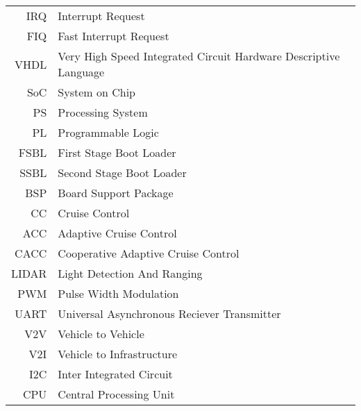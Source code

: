 \begin{tabular}{r l}
IRQ		&Interrupt Request\\
FIQ		&Fast Interrupt Request\\
VHDL	&Very High Speed Integrated Circuit Hardware Descriptive Language\\
SoC		&System on Chip\\
PS		&Processing System\\
PL		&Programmable Logic\\
FSBL	&First Stage Boot Loader\\
SSBL	&Second Stage Boot Loader\\
BSP		&Board Support Package\\
CC		&Cruise Control\\
ACC		&Adaptive Cruise Control\\
CACC	&Cooperative Adaptive Cruise Control\\
LIDAR	&Light Detection And Ranging\\
PWM		&Pulse Width Modulation\\
UART	&Universal Asynchronous Reciever Transmitter\\
V2V		&Vehicle to Vehicle\\
V2I		&Vehicle to Infrastructure\\
I2C		&Inter Integrated Circuit\\
CPU		&Central Processing Unit\\


\end{tabular}